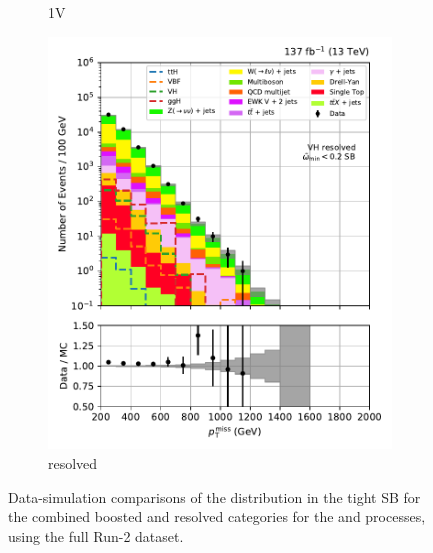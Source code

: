 \begin{figure}[htbp]
\begin{subfigure}[b]{0.24\textwidth}
        \caption{\VH 1V}
    \end{subfigure}
    \hfill
    \begin{subfigure}[b]{0.24\textwidth}
        \includegraphics[width=\textwidth]{figures/region_plots/full_Run2/sideband_3/VH_resolved.pdf}
        \caption{\VH resolved}
    \end{subfigure}
    \caption[Data-simulation comparisons of the \ptmiss distribution in the tight \omegaTilde sideband for the combined boosted and resolved categories for the \ttH and \VH processes, using the full Run-2 dataset]{Data-simulation comparisons of the \ptmiss distribution in the tight \omegaTilde \gls{SB} for the combined boosted and resolved categories for the \ttH and \VH processes, using the full Run-2 dataset.}
    \label{fig:htoinv_sb_yields_comb2016to18_tight_minOmegaTilde}
\end{figure}

